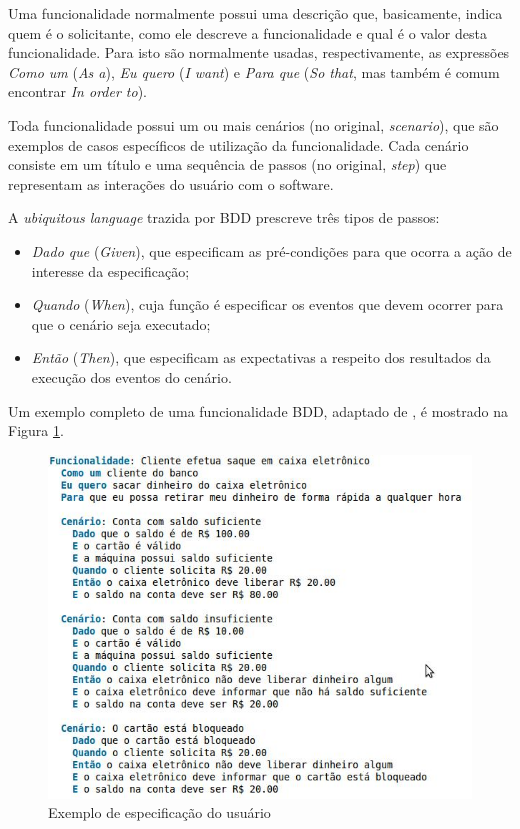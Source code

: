 \documentclass[a4paper,abntfigtabnum,noindentfirst]{abnt}
\begin{document}
Uma funcionalidade normalmente possui uma descrição que, basicamente, indica quem é o solicitante, como ele descreve a funcionalidade e qual é o valor desta funcionalidade. Para isto são normalmente usadas, respectivamente, as expressões \textit{Como um} (\textit{As a}), \textit{Eu quero} (\textit{I want}) e \textit{Para que} (\textit{So that}, mas também é comum encontrar \textit{In order to}).

Toda funcionalidade possui um ou mais cenários (no original, \textit{scenario}), que são exemplos de casos específicos de utilização da funcionalidade. Cada cenário consiste em um título e uma sequência de passos (no original, \textit{step}) que representam as interações do usuário com o software.

A \textit{ubiquitous language} trazida por BDD prescreve três tipos de passos:
\begin{itemize}

\item \textit{Dado que} (\textit{Given}), que especificam as pré-condições para que ocorra a ação de interesse da especificação;
\item \textit{Quando} (\textit{When}), cuja função é especificar os eventos que devem ocorrer para que o cenário seja executado;
\item \textit{Então} (\textit{Then}), que especificam as expectativas a respeito dos resultados da execução dos eventos do cenário.
\end{itemize}

Um exemplo completo de uma funcionalidade BDD, adaptado de , é mostrado na Figura \ref{exemplo-de-funcionalidade}.

\begin{figure}
	\caption{Exemplo de especificação do usuário}
	\label{exemplo-de-funcionalidade}
	\includegraphics[scale=0.7]{exemplo-de-funcionalidade-bdd}
\end{figure}
\end{document}
